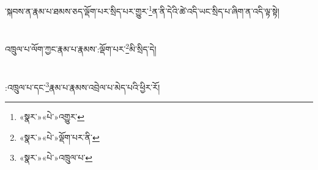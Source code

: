 ་སྐབས་ན་རྣམ་པ་ཐམས་ཅད་ལྡོག་པར་སྲིད་པར་གྱུར་\footnote{«སྣར་»«པེ་»འགྱུར་}ན་ནི་དེའི་ཚེ་འདི་ཡང་སྲིད་པ་ཞིག་ན་འདི་ལྟ་སྟེ།\chapter{ }འཁྲུལ་པ་ལོག་ཀྱང་རྣམ་པ་རྣམས་:ལྡོག་པར་\footnote{«སྣར་»«པེ་»ལྡོག་པར་ནི་}མི་སྲིད་དེ།\chapter{ }:འཁྲུལ་པ་དང་\footnote{«སྣར་»«པེ་»འཁྲུལ་པ་}རྣམ་པ་རྣམས་འབྲེལ་པ་མེད་པའི་ཕྱིར་རོ།\ch